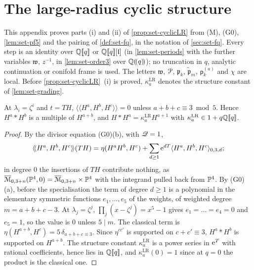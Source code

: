 \section{The large-radius cyclic structure}
\label{sec:set-lrproof}

This appendix proves parts (i) and (ii) of \cref{prop:set-cyclicLR} from (M), (G0), \cref{lem:set-pf5} and the pairing of \cref{def:set-fq}, in the notation of \cref{sec:set-fq}. Every step is an identity over $\mathbb{Q}[\![ q ]\!]$ or $\mathbb{Q}[\![ q ]\!][\mathfrak{l}]$ (in \cref{lem:set-periods} with the further variables $\mathfrak w$, $z^{-1}$, in \cref{lem:set-order3} over $\mathbb{Q}(\!(q)\!)$); no truncation in $q$, analytic continuation or conifold frame is used. The letters $\mathfrak w$, $\mathcal{P}$, $\mathfrak p_k$, $\tilde{\mathfrak p}_m$, $\mathsf p^{(a)}_k$ and $\chi$ are local. Before \cref{prop:set-cyclicLR}~(i) is proved, $\kappa^{\mathrm{LR}}_a$ denotes the structure constant of \cref{lem:set-grading}.

\begin{lem}
\label{lem:set-grading}
At $\lambda_i=\zeta^i$ and $t=TH$, $\langle\!\langle H^a,H^b,H^c\rangle\!\rangle=0$ unless $a+b+c\equiv3\bmod5$. Hence $H^a*H^b$ is a multiple of $H^{a+b}$, and $H*H^a=\kappa^{\mathrm{LR}}_aH^{a+1}$ with $\kappa^{\mathrm{LR}}_a\in1+q\mathbb{Q}[\![ q ]\!]$.
\end{lem}

\begin{proof}
By the divisor equation (G0)(b), with $\mathscr{Q}=1$,
\[
\langle\!\langle H^a,H^b,H^c\rangle\!\rangle(TH)=\eta(H^aH^b,H^c)+\sum_{d\geq1}\mathrm{e}^{dT}\langle H^a,H^b,H^c\rangle_{0,3,d};
\]
in degree $0$ the insertions of $TH$ contribute nothing, as $\overline{\mathcal M}_{0,3+n}(\mathbb{P}^4,0)=\overline{\mathcal M}_{0,3+n}\times\mathbb{P}^4$ with the integrand pulled back from $\mathbb{P}^4$. By (G0)(a), before the specialisation the term of degree $d\geq1$ is a polynomial in the elementary symmetric functions $e_1,\dots,e_5$ of the weights, of weighted degree $m=a+b+c-3$. At $\lambda_j=\zeta^j$, $\prod_j(x-\zeta^j)=x^5-1$ gives $e_1=\dots=e_4=0$ and $e_5=1$, so the value is $0$ unless $5\mid m$. The classical term is $\eta(H^{a+b},H^c)=5\,\delta_{a+b+c\equiv3}$. Since $\eta^{cc'}$ is supported on $c+c'\equiv3$, $H^a*H^b$ is supported on $H^{a+b}$. The structure constant $\kappa^{\mathrm{LR}}_a$ is a power series in $\mathrm{e}^T$ with rational coefficients, hence lies in $\mathbb{Q}[\![ q ]\!]$, and $\kappa^{\mathrm{LR}}_a(0)=1$ since at $q=0$ the product is the classical one.
\end{proof}

